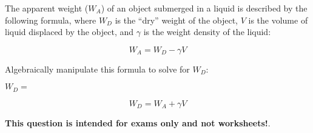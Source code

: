 

The apparent weight ($W_A$) of an object submerged in a liquid is described by the following formula, where $W_D$ is the ``dry'' weight of the object, $V$ is the volume of liquid displaced by the object, and $\gamma$ is the weight density of the liquid:

$$W_A = W_D - \gamma V$$

Algebraically manipulate this formula to solve for $W_D$:

\vskip 20pt

$W_D = $







$$W_D = W_A + \gamma V$$







{\bf This question is intended for exams only and not worksheets!}.



